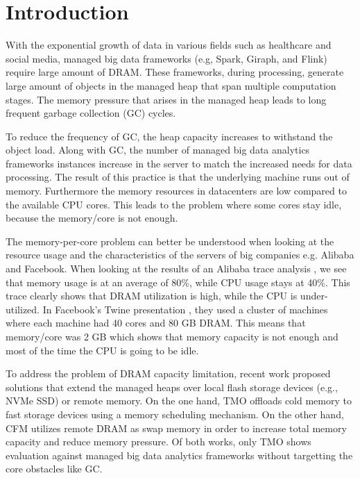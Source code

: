 \section{Introduction}
\label{sec:intro}

With the exponential growth of data in various fields such as
healthcare and social media, managed big data frameworks (e.g, Spark,
Giraph, and Flink) require large amount of DRAM. 
These frameworks, during processing, generate large amount of objects
in the managed heap that span multiple computation stages.
The memory pressure that arises in the managed heap leads to long frequent garbage
collection (GC) cycles.

To reduce the frequency of GC, the heap capacity increases to withstand the object load.
Along with GC, the number of managed big data analytics frameworks instances increase
in the server to match the increased needs for data processing. The result of this practice
is that the underlying machine runs out of memory. Furthermore the memory resources
in datacenters are low compared to the available CPU cores.
This leads to the problem where some cores stay idle, because the memory/core is not enough.

The memory-per-core problem can better be understood when looking at the
resource usage and the characteristics of the servers of big companies e.g. Alibaba and Facebook.
When looking at the results of an Alibaba trace analysis \cite{Alibaba}, we see that memory usage
is at an average of 80\%, while CPU usage stays at 40\%. This trace clearly shows that DRAM utilization
is high, while the CPU is under-utilized. In Facebook's Twine presentation \cite{Twine},
they used a cluster of machines where each machine had 40 cores and 80 GB DRAM. This
means that memory/core was 2 GB which shows that memory capacity is not enough and most of the time
the CPU is going to be idle.

To address the problem of DRAM capacity limitation, recent work
proposed solutions that extend the managed heaps over local flash
storage devices (e.g., NVMe SSD) or remote memory. On the one hand,
TMO \cite{TMO} offloads cold memory to fast storage devices using
a memory scheduling mechanism. On the other hand, CFM \cite{CFM}
utilizes remote DRAM as swap memory in order to increase total memory capacity
and reduce memory pressure. Of both works, only TMO shows
evaluation against managed big data analytics frameworks without
targetting the core obstacles like GC.

